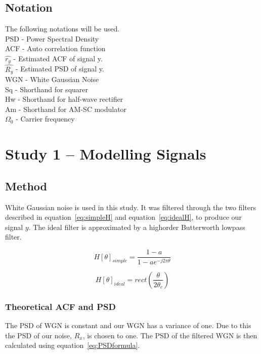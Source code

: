 \documentclass[10pt]{article}
\begin{document}
\subsection{Notation}
The following notations will be used. \\
PSD - Power Spectral Density \\
ACF - Auto correlation function \\
$\hat{r_y}$ - Estimated ACF of signal y. \\
$\hat{R_y}$ - Estimated PSD of signal y. \\
WGN - White Gaussian Noise\\
Sq - Shorthand for squarer\\
Hw - Shorthand for half-wave rectifier\\
Am - Shorthand for AM-SC modulator\\
$\Omega_0$ - Carrier frequency\\

\section{Study 1 – Modelling Signals}
\subsection{Method}

White Gaussian noise is used in this study. It was filtered through the two
 filters described in equation~\ref{eq:simpleH} and equation~\ref{eq:idealH},
  to produce our signal $y$.
 The ideal filter is approximated by a highorder Butterworth lowpass filter.

\begin{equation}
  \label{eq:simpleH}
  H[\theta]_{simple} =\frac{1-a}{1-ae^{-j2\pi\theta }}
\end{equation}

\begin{equation}
  \label{eq:idealH}
  H[\theta]_{ideal} =rect(\frac{\theta}{2\theta_c} )
\end{equation}

\subsubsection{Theoretical ACF and PSD}
The PSD of WGN is constant and our WGN has a variance of one. Due to this the PSD
of our noise, $R_x$, is chosen to one.
The PSD of the filtered WGN is then calculated using equation~\ref{eq:PSDformula}.
\end{document}
